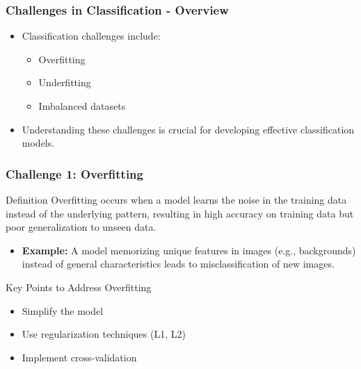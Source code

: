 \documentclass{beamer}
\begin{document}
\begin{frame}[fragile]
    \frametitle{Challenges in Classification - Overview}
    \begin{itemize}
        \item Classification challenges include:
        \begin{itemize}
            \item Overfitting
            \item Underfitting
            \item Imbalanced datasets
        \end{itemize}
        \item Understanding these challenges is crucial for developing effective classification models.
    \end{itemize}
\end{frame}

\begin{frame}[fragile]
    \frametitle{Challenge 1: Overfitting}
    \begin{block}{Definition}
        Overfitting occurs when a model learns the noise in the training data instead of the underlying pattern, resulting in high accuracy on training data but poor generalization to unseen data.
    \end{block}
    \begin{itemize}
        \item \textbf{Example:} A model memorizing unique features in images (e.g., backgrounds) instead of general characteristics leads to misclassification of new images.
    \end{itemize}
    \begin{block}{Key Points to Address Overfitting}
        \begin{itemize}
            \item Simplify the model
            \item Use regularization techniques (L1, L2)
            \item Implement cross-validation
        \end{itemize}
    \end{block}
\end{frame}
\end{document}
